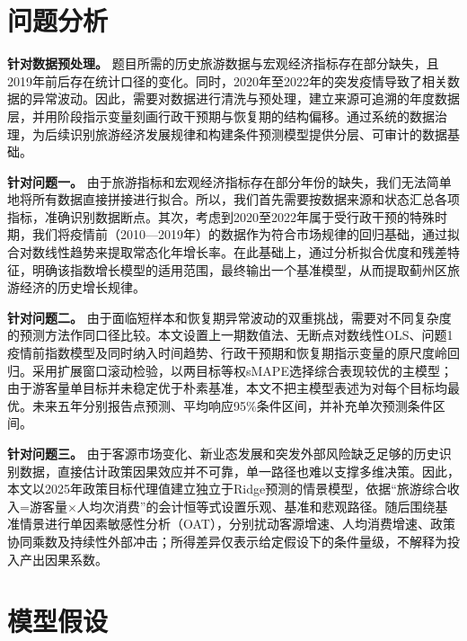 \documentclass[withoutpreface,bwprint]{cumcmthesis}
\begin{document}
\section{问题分析}

\textbf{针对数据预处理。}
题目所需的历史旅游数据与宏观经济指标存在部分缺失，且2019年前后存在统计口径的变化。同时，2020年至2022年的突发疫情导致了相关数据的异常波动。因此，需要对数据进行清洗与预处理，建立来源可追溯的年度数据层，并用阶段指示变量刻画行政干预期与恢复期的结构偏移。通过系统的数据治理，为后续识别旅游经济发展规律和构建条件预测模型提供分层、可审计的数据基础。

\textbf{针对问题一。}
由于旅游指标和宏观经济指标存在部分年份的缺失，我们无法简单地将所有数据直接拼接进行拟合。所以，我们首先需要按数据来源和状态汇总各项指标，准确识别数据断点。其次，考虑到2020至2022年属于受行政干预的特殊时期，我们将疫情前（2010—2019年）的数据作为符合市场规律的回归基础，通过拟合对数线性趋势来提取常态化年增长率。在此基础上，通过分析拟合优度和残差特征，明确该指数增长模型的适用范围，最终输出一个基准模型，从而提取蓟州区旅游经济的历史增长规律。

\textbf{针对问题二。}
由于面临短样本和恢复期异常波动的双重挑战，需要对不同复杂度的预测方法作同口径比较。本文设置上一期数值法、无断点对数线性OLS、问题1疫情前指数模型及同时纳入时间趋势、行政干预期和恢复期指示变量的原尺度岭回归。采用扩展窗口滚动检验，以两目标等权sMAPE选择综合表现较优的主模型；由于游客量单目标并未稳定优于朴素基准，本文不把主模型表述为对每个目标均最优。未来五年分别报告点预测、平均响应95\%条件区间，并补充单次预测条件区间。

\textbf{针对问题三。}
由于客源市场变化、新业态发展和突发外部风险缺乏足够的历史识别数据，直接估计政策因果效应并不可靠，单一路径也难以支撑多维决策。因此，本文以2025年政策目标代理值建立独立于Ridge预测的情景模型，依据“旅游综合收入=游客量$\times$人均次消费”的会计恒等式设置乐观、基准和悲观路径。随后围绕基准情景进行单因素敏感性分析（OAT），分别扰动客源增速、人均消费增速、政策协同乘数及持续性外部冲击；所得差异仅表示给定假设下的条件量级，不解释为投入产出因果系数。


\section{模型假设}
\end{document}

